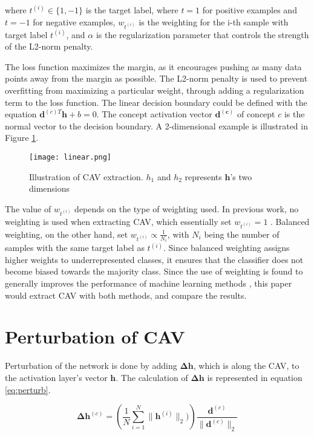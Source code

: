 where $t^{(i)} \in \{1, -1\}$ is the target label, where $t = 1$ for positive examples and $t = -1$ for negative examples, $w_{t^{(i)}}$ is the weighting for the i-th sample with target label $t^{(i)}$, and $\alpha$ is the regularization parameter that controls the strength of the L2-norm penalty.

The loss function maximizes the margin, as it encourages pushing as many data points away from the margin as possible. The L2-norm penalty is used to prevent overfitting from maximizing a particular weight, through adding a regularization term to the loss function. The linear decision boundary could be defined with the equation $\boldsymbol{d}^{(c)T}\boldsymbol{h} + b = 0$. The concept activation vector $\boldsymbol{d^{(c)}}$ of concept $c$ is the normal vector to the decision boundary. A 2-dimensional example is illustrated in Figure \ref{fig:linear}.

\begin{figure}[H]
    \centering
    \texttt{[image: linear.png]}
    \caption{Illustration of CAV extraction. $h_1$ and $h_2$ represents  $\boldsymbol{h}$'s two dimensions}
    \label{fig:linear}
\end{figure}

The value of $w_{t^{(i)}}$ depends on the type of weighting used. In previous work, no weighting is used when extracting CAV, which essentially set $w_{t^{(i)}} = 1$ \cite{feature_bias}. Balanced weighting, on the other hand, set $w_{t^{(i)}} \propto \frac{1}{N_{i}}$, with $N_i$ being the number of samples with the same target label as $t^{(i)}$. Since balanced weighting assigns higher weights to underrepresented classes, it ensures that the classifier does not become biased towards the majority class. Since the use of weighting is found to generally improves the performance of machine learning methods \cite{balanced}, this paper would extract CAV with both methods, and compare the results.

\section{Perturbation of CAV}

Perturbation of the network is done by adding $\boldsymbol{\Delta h}$, which is along the CAV, to the activation layer's vector $\boldsymbol{h}$. The calculation of $\boldsymbol{\Delta h}$ is represented in equation \ref{eq:perturb}.

\begin{equation} \label{eq:perturb}
    \boldsymbol{\Delta h}^{(c)} = \left(\frac{1}{N}\sum_{i=1}^{N} \|\boldsymbol{h}^{(i)}\|_{2}) \right) \frac{ \boldsymbol{d}^{(c)}}{\| \boldsymbol{d}^{(c)}\|_2}
\end{equation}

